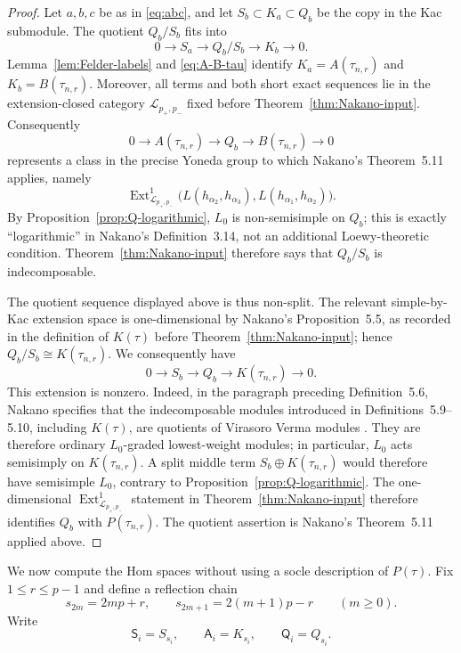 \documentclass[12pt,leqno]{amsart}
\numberwithin{equation}{section}
\newcommand{\Ext}{\operatorname{Ext}}
\begin{document}
\begin{proof}
Let $a,b,c$ be as in \eqref{eq:abc}, and let
$S_b\subset K_a\subset Q_b$ be the copy in the Kac submodule.  The quotient
$Q_b/S_b$ fits into
\[
 0\longrightarrow S_a\longrightarrow Q_b/S_b
 \longrightarrow K_b\longrightarrow0.
\]
Lemma~\ref{lem:Felder-labels} and \eqref{eq:A-B-tau} identify
$K_a=A(\tau_{n,r})$ and $K_b=B(\tau_{n,r})$.  Moreover, all terms and both
short exact sequences lie in the extension-closed category
$\mathscr L_{p_+,p_-}$ fixed before Theorem~\ref{thm:Nakano-input}.
Consequently
\[
 0\longrightarrow A(\tau_{n,r})\longrightarrow Q_b
 \longrightarrow B(\tau_{n,r})\longrightarrow0
\]
represents a class in the precise Yoneda group to which Nakano's
Theorem~5.11 applies, namely
\[
 \Ext^1_{\mathscr L_{p_+,p_-}}
 \bigl(L(h_{\alpha_2},h_{\alpha_3}),
       L(h_{\alpha_1},h_{\alpha_2})\bigr).
\]
By Proposition~\ref{prop:Q-logarithmic}, $L_0$ is
non-semisimple on $Q_b$; this is exactly ``logarithmic'' in Nakano's
Definition~3.14, not an additional Loewy-theoretic condition.
Theorem~\ref{thm:Nakano-input} therefore says that $Q_b/S_b$ is
indecomposable.

The quotient sequence displayed above is thus non-split.  The relevant
simple-by-Kac extension space is one-dimensional by Nakano's
Proposition~5.5, as recorded in the definition of $K(\tau)$ before
Theorem~\ref{thm:Nakano-input}; hence
$Q_b/S_b\cong K(\tau_{n,r})$.  We consequently have
\[
 0\longrightarrow S_b\longrightarrow Q_b
 \longrightarrow K(\tau_{n,r})\longrightarrow0.
\]
This extension is nonzero.  Indeed, in the paragraph preceding
Definition~5.6, Nakano specifies that the indecomposable modules introduced
in Definitions~5.9--5.10, including $K(\tau)$, are quotients of Virasoro
Verma modules \cite[Section~5.2]{Nakano}.  They are therefore ordinary
$L_0$-graded lowest-weight modules; in particular, $L_0$ acts semisimply on
$K(\tau_{n,r})$.  A split middle term
$S_b\oplus K(\tau_{n,r})$ would therefore have semisimple $L_0$, contrary to
Proposition~\ref{prop:Q-logarithmic}.  The one-dimensional
$\Ext^1_{\mathscr L_{p_+,p_-}}$ statement in
Theorem~\ref{thm:Nakano-input}
therefore identifies $Q_b$ with $P(\tau_{n,r})$.  The quotient assertion is
Nakano's Theorem~5.11 applied above.
\end{proof}

We now compute the Hom spaces without using a socle description of
$P(\tau)$.  Fix $1\leq r\leq p-1$ and define a reflection chain
\begin{equation}\label{eq:reflection-chain}
 s_{2m}=2mp+r,
 \qquad
 s_{2m+1}=2(m+1)p-r
 \qquad(m\geq0).
\end{equation}
Write
\[
 \mathsf S_i=S_{s_i},
 \qquad \mathsf A_i=K_{s_i},
 \qquad \mathsf Q_i=Q_{s_i}.
\]
\end{document}
